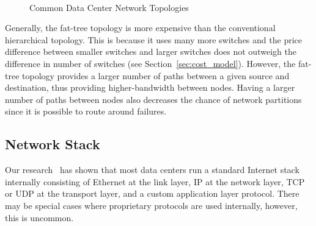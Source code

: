 \captionsetup[subfloat]{captionskip=-0.003in}
\begin{figure}
    \centering
    \\
    \vspace{-0.1in}
    \vspace{-0.07in}
    \caption{Common Data Center Network Topologies}
    \vspace{-0.1in}
    \label{fig:common_topos}
\end{figure}

Generally, the fat-tree topology is more expensive than the conventional hierarchical topology.  This is because it uses many more switches and the price difference between smaller switches and larger switches does not outweigh the difference in number of switches (see Section~\ref{sec:cost_model}).  However, the fat-tree topology provides a larger number of paths between a given source and destination, thus providing higher-bandwidth between nodes.  Having a larger number of paths between nodes also decreases the chance of network partitions since it is possible to route around failures.

\subsection {Network Stack}

Our research~\cite{Regnier:2004:TCPODCS,Alizadeh:2010:DCT,Kandula:2009:NDC} has shown that most data centers run a standard Internet stack internally consisting of Ethernet at the link layer, IP at the network layer, TCP or UDP at the transport layer, and a custom application layer protocol.  There may be special cases where proprietary protocols are used internally, however, this is uncommon.
